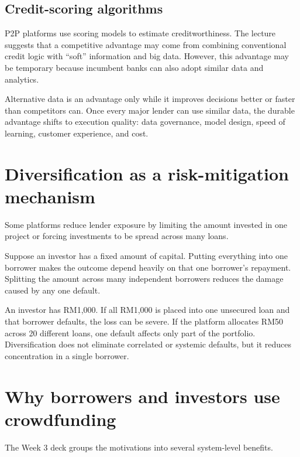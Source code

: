 \subsection{Credit-scoring algorithms}

P2P platforms use scoring models to estimate creditworthiness. The lecture suggests that a competitive advantage may come from combining conventional credit logic with ``soft'' information and big data. However, this advantage may be temporary because incumbent banks can also adopt similar data and analytics.

\begin{intuition}
Alternative data is an advantage only while it improves decisions better or faster than competitors can. Once every major lender can use similar data, the durable advantage shifts to execution quality: data governance, model design, speed of learning, customer experience, and cost.
\end{intuition}

\section{Diversification as a risk-mitigation mechanism}

Some platforms reduce lender exposure by limiting the amount invested in one project or forcing investments to be spread across many loans.

Suppose an investor has a fixed amount of capital. Putting everything into one borrower makes the outcome depend heavily on that one borrower's repayment. Splitting the amount across many independent borrowers reduces the damage caused by any one default.

\begin{workedexample}
An investor has RM1,000. If all RM1,000 is placed into one unsecured loan and that borrower defaults, the loss can be severe. If the platform allocates RM50 across 20 different loans, one default affects only part of the portfolio. Diversification does not eliminate correlated or systemic defaults, but it reduces concentration in a single borrower.
\end{workedexample}

\section{Why borrowers and investors use crowdfunding}

The Week 3 deck groups the motivations into several system-level benefits.

